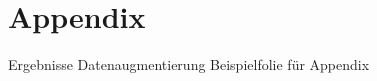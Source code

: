 \section{Appendix}

\begin{frame}{Ergebnisse Datenaugmentierung}
    Beispielfolie für Appendix
\end{frame}
